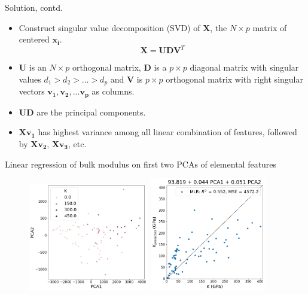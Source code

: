 \documentclass{beamer}
\let \vec \mathbf
\begin{document}
\begin{frame}{Solution, contd.}
    \begin{itemize}
        \item Construct singular value decomposition (SVD) of $\vec{X}$, the $N \times p$ matrix of centered $\vec{x_i}$.
        \begin{equation*}
            \vec{X} = \vec{U}\vec{D}\vec{V}^T
        \end{equation*}
        \item $\vec{U}$ is an $N \times p$ orthogonal matrix, $\vec{D}$ is a $p\times p $ diagonal matrix with singular values $d_1 > d_2 > ... > d_p$ and $\vec{V}$ is $p \times p$ orthogonal matrix with right singular vectors $\vec{v_1}, \vec{v_2}, ...\vec{v_p}$ as columns.
        \item $\vec{UD}$ are the principal components. 
        \item $\vec{Xv_1}$ has highest variance among all linear combination of features, followed by $\vec{Xv_2}$, $\vec{Xv_3}$, etc.
    \end{itemize}
\end{frame} 


\begin{frame}{Linear regression of bulk modulus on first two PCAs of elemental features}
\begin{figure}
    \centering
    \includegraphics[width=0.47\textwidth]{figures/pca-elements.png}
    \includegraphics[width=0.45\textwidth]{figures/pca-regression.png}
\end{figure}
\end{frame} 
\end{document}

